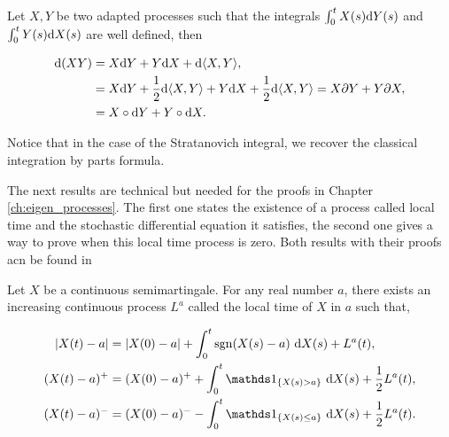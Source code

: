 \begin{theorem} \label{thm:partes} %
    Let $X, Y$ be two adapted processes such that the integrals $\int_0^t X(s) \mathrm d Y(s)$ and $\int_0^t Y(s) \mathrm d X(s)$ are well defined, then

    \begin{align*}
        \mathrm d(XY) &= X \mathrm d Y + Y \mathrm d X + \mathrm d \langle X, Y \rangle,\\
        &= X \mathrm d Y + \frac12 \mathrm d \langle X, Y \rangle + Y \mathrm d X + \frac12 \mathrm d \langle X, Y \rangle = X \partial Y + Y \partial X,\\  
        &= X \circ \mathrm d Y + Y \circ \mathrm d X.
    \end{align*}
\end{theorem}

Notice that in the case of the Stratanovich integral, we recover the classical integration by parts formula.



The next results are technical but needed for the proofs in Chapter \ref{ch:eigen_processes}. The first one states the existence of a process called local time and the stochastic differential equation it satisfies, the second one gives a way to prove when this local time process is zero. Both results with their proofs acn be found in \cite{book:revuzyor}


\begin{theorem}
    Let $X$ be a continuous semimartingale. For any real number $a$, there exists an increasing continuous process $L^a$ called the local time of $X$ in $a$ such that,


    \begin{align*}
        \abs{X(t) - a} &= \abs{X(0) - a} + \int_0^t \mathrm{sgn}(X(s) - a)~\d X(s) + L^a(t),\\
        (X(t) - a)^+ &= (X(0) - a)^+ + \int_0^t \mathds 1_{\{X(s) > a\}}~\d X(s) + \frac12 L^a(t),\\
        (X(t) - a)^- &= (X(0) - a)^- - \int_0^t \mathds 1_{\{X(s) \le a\}}~\d X(s) + \frac12 L^a(t).
    \end{align*}

\end{theorem}


